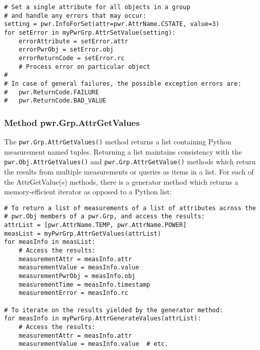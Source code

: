 \begin{center}\begin{minipage}{.95\linewidth}\begin{lstlisting}
# Set a single attribute for all objects in a group
# and handle any errors that may occur:
setting = pwr.InfoForSet(attr=pwr.AttrName.CSTATE, value=3)
for setError in myPwrGrp.AttrSetValue(setting):
    errorAttribute = setError.attr
    errorPwrObj = setError.obj
    errorReturnCode = setError.rc
    # Process error on particular object
#
# In case of general failures, the possible exception errors are:
#   pwr.ReturnCode.FAILURE
#   pwr.ReturnCode.BAD_VALUE
\end{lstlisting}\end{minipage}\end{center}

\subsubsection{Method pwr.Grp.AttrGetValues}
\label{meth:GrpAttrGetValues}

The \texttt{pwr.Grp.AttrGetValues()} method returns a list containing Python
measurement named tuples. Returning a list maintains consistency with the
\texttt{pwr.Obj.AttrGetValues()} and \texttt{pwr.Grp.AttrGetValue()}
methods which return the results from multiple measurements or queries as items
in a list. For each of the AttrGetValue(s) methods, there is a generator
method which returns a memory-efficient iterator as opposed to a Python list:

\begin{center}\begin{minipage}{.95\linewidth}\begin{lstlisting}
# To return a list of measurements of a list of attributes across the
# pwr.Obj members of a pwr.Grp, and access the results:
attrList = [pwr.AttrName.TEMP, pwr.AttrName.POWER]
measList = myPwrGrp.AttrGetValues(attrList)
for measInfo in measList:
    # Access the results:
    measurementAttr = measInfo.attr
    measurementValue = measInfo.value
    measurementPwrObj = measInfo.obj
    measurementTime = measInfo.timestamp
    measurementError = measInfo.rc

# To iterate on the results yielded by the generator method:
for measInfo in myPwrGrp.AttrGenerateValues(attrList):
    # Access the results:
    measurementAttr = measInfo.attr
    measurementValue = measInfo.value  # etc.
\end{lstlisting}\end{minipage}\end{center}

